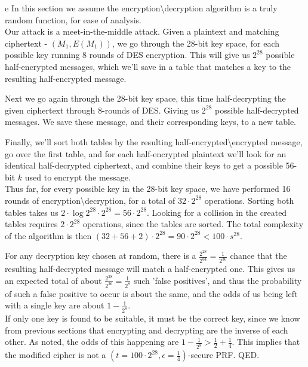 \documentclass{article}
\begin{document}
\begin{paragraph}
	e In this section we assume the encryption\textbackslash decryption algorithm is a truly random function, for ease of analysis.\\
	
	Our attack is a meet-in-the-middle attack. Given a plaintext and matching ciphertext - $(M_1, E(M_1))$, we go through the 28-bit key space, for each possible key running 8 rounds of DES encryption. This will give us $2^{28}$ possible half-encrypted messages, which we'll save in a table that matches a key to the resulting half-encrypted message. 
	
	Next we go again through the 28-bit key space, this time half-decrypting the given ciphertext through 8-rounds of DES. Giving us $2^{28}$ possible half-decrypted messages. We save these message, and their corresponding keys, to a new table.
	
	Finally, we'll sort both tables by the resulting half-encrypted\textbackslash encrypted message, go over the first table, and for each half-encrypted plaintext we'll look for an identical half-decrypted ciphertext, and combine their keys to get a possible 56-bit $k$ used to encrypt the message.\\
	
	Thus far, for every possible key in the 28-bit key space, we have performed 16 rounds of encryption\textbackslash decryption, for a total of $32 \cdot 2^{28}$ operations. Sorting both tables takes us $2 \cdot \log2^{28} \cdot 2^{28} = 56 \cdot 2^{28}$. Looking for a collision in the created tables requires $2 \cdot 2^{28}$ operations, since the tables are sorted. The total complexity of the algorithm is then $(32 + 56 + 2) \cdot 2^{28} = 90 \cdot 2^{28} < 100 \cdot s^{28}$.
	
	For any decryption key chosen at random, there is a $\frac{2^{28}}{2^{64}} = \frac{1}{2^{36}}$ chance that the resulting half-decrypted message will match a half-encrypted one. This gives us an expected total of about $\frac{2^{28}}{2^{36}} = \frac{1}{2^8}$ such 'false positives', and thus the probability of such a false positive to occur is about the same, and the odds of us being left with a single key are about $1 - \frac{1}{2^8}$.\\
	
	If only one key is found to be suitable, it must be the correct key, since we know from previous sections that encrypting and decrypting are the inverse of each other. As noted, the odds of this happening are $1 - \frac{1}{2^8} > \frac{1}{2} + \frac{1}{4}$. This implies that the modified cipher is not a $\left(t = 100 \cdot 2^{28}, \epsilon = \frac{1}{4}\right)$-secure PRF. QED.
\end{paragraph}
\newpage
\end{document}
